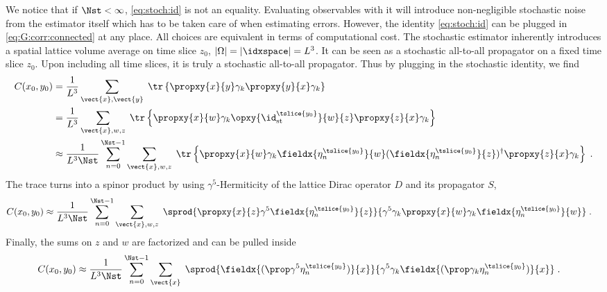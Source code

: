 We notice that if $\Nst < \infty$, \cref{eq:stoch:id} is not an equality.
Evaluating observables with it will introduce non-negligible stochastic noise from the estimator itself which has to be taken care of when estimating errors.
However, the identity \cref{eq:stoch:id} can be plugged in \cref{eq:G:corr:connected} at any place.
All choices are equivalent in terms of computational cost.
The stochastic estimator inherently introduces a spatial lattice volume average on time slice $z_0$, \ie $\lvert \Omega \rvert = \lvert \idxspace \rvert = L^{3}$.
It can be seen as a stochastic all-to-all propagator on a fixed time slice $z_0$.
Upon including all time slices, it is truly a stochastic all-to-all propagator.
Thus by plugging in the stochastic identity, we find
\begin{align}
C(x_0, y_0)
&= \frac{1}{L^{3}} \sum_{\vect{x}, \vect{y}} \;
\tr \left\{ \propxy{x}{y} \gamma_k \propxy{y}{x} \gamma_k \right\} \\
&= \frac{1}{L^{3}} \sum_{\vect{x}, w, z} \;
\tr \left\{
  \propxy{x}{w} \gamma_k
  \opxy{\id^{\tslice{y_0}}_{\text{st}}}{w}{z}
  \propxy{z}{x} \gamma_k
\right\} \\
&\approx \frac{1}{L^{3} \Nst} \sum_{n=0}^{\Nst-1} \sum_{\vect{x}, w, z} \;
\tr \left\{
  \propxy{x}{w} \gamma_k
  \fieldx{\eta_n^{\tslice{y_0}}}{w}
  (\fieldx{\eta_n^{\tslice{y_0}}}{z})^{\dagger}
  \propxy{z}{x} \gamma_k
\right\} \;.
\end{align}
The trace turns into a spinor product by using $\gamma^{5}$-Hermiticity of the lattice Dirac operator $D$ and its propagator $S$,
\begin{align}
C(x_0, y_0)
&\approx \frac{1}{L^{3} \Nst} \sum_{n=0}^{\Nst-1} \sum_{\vect{x}, w, z} \;
\sprod{
  \propxy{x}{z}
  \gamma^{5}
  \fieldx{\eta_n^{\tslice{y_0}}}{z}
}{
  \gamma^{5}
  \gamma_k
  \propxy{x}{w}
  \gamma_k
  \fieldx{\eta_n^{\tslice{y_0}}}{w}
} \;.
\end{align}
Finally, the sums on $z$ and $w$ are factorized and can be pulled inside
\begin{align} \label{eq:stoch:C:full}
C(x_0, y_0)
&\approx \frac{1}{L^{3} \Nst} \sum_{n=0}^{\Nst-1} \sum_{\vect{x}} \;
\sprod{
  \fieldx{(\prop
  \gamma^{5}
  \eta_n^{\tslice{y_0}})}{x}
}{
  \gamma^{5}
  \gamma_k
  \fieldx{(\prop \gamma_k
  \eta_n^{\tslice{y_0}})}{x}
} \;.
\end{align}
